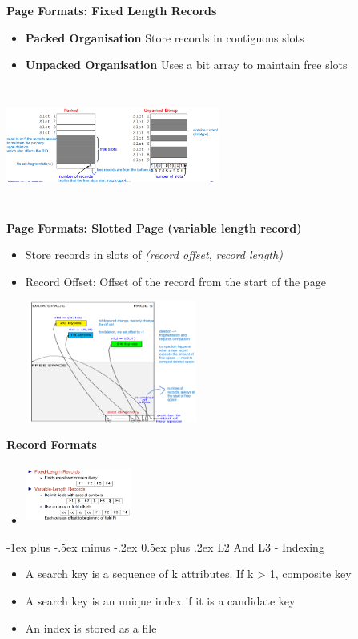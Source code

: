\documentclass[10pt, landscape]{article}
\makeatletter
\renewcommand{\section}{\@startsection{section}{1}{0mm}%
                                {-1ex plus -.5ex minus -.2ex}%
                                {0.5ex plus .2ex}%
                                {\normalfont\large\bfseries}}
\makeatother
\begin{document}
\begin{multicols}{4}
\textbf{Page Formats: Fixed Length Records}
\begin{itemize}
  \item \textbf{Packed Organisation} Store records in contiguous slots
  \item \textbf{Unpacked Organisation} Uses a bit array to maintain free slots
\end{itemize}

\includegraphics*[width=7cm, height=4cm]{page_org.png}


\textbf{Page Formats: Slotted Page (variable length record)}
\begin{itemize}
  \item Store records in slots of \textsl{(record offset, record length)}
  \item Record Offset: Offset of the record from the start of the page
\end{itemize}

\includegraphics*[width=7cm, height=4cm]{slot_page.png}

\textbf{Record Formats}
\begin{itemize}
  \item \includegraphics[width=3.5cm, height=2cm]{var_record.png}
\end{itemize}


\section{L2 And L3 - Indexing}
\begin{itemize}
  \item A search key is a sequence of k attributes. If k > 1, composite key
  \item A search key is an unique index if it is a candidate key
  \item An index is stored as a file
\end{itemize}


\end{multicols}
\end{document}
